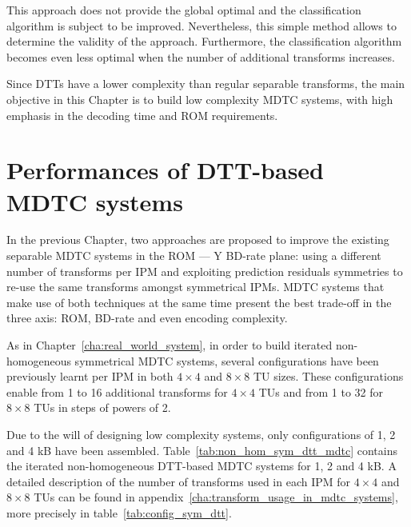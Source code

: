 \documentclass[11pt,a4paper,openright,twoside]{book}
\numberwithin{equation}{section} %
\numberwithin{figure}{section} %
\numberwithin{table}{section} %
\begin{document}
This approach does not provide the global optimal and the classification
algorithm is subject to be improved.
Nevertheless, this simple method allows to determine the validity of the
approach.
Furthermore, the classification algorithm becomes even less optimal when the
number of additional transforms increases.

Since \acp{DTT} have a lower complexity than regular separable transforms, the
main objective in this Chapter is to build low complexity \ac{MDTC} systems,
with high emphasis in the decoding time and \acs{ROM} requirements.

\section{Performances of \acs{DTT}-based \acs{MDTC} systems}
\label{sec:performances_dtt_based_mdtc_systems}

In the previous Chapter, two approaches are proposed to improve the existing
separable \ac{MDTC} systems in the \acs{ROM} --- Y \ac{BD}-rate plane:
using a different number of transforms per \ac{IPM} and exploiting prediction
residuals symmetries to re-use the same transforms amongst symmetrical
\acp{IPM}.
\ac{MDTC} systems that make use of both techniques at the same time present
the best trade-off in the three axis: \acs{ROM}, \ac{BD}-rate and even
encoding complexity.

As in Chapter~\ref{cha:real_world_system}, in order to build iterated
non-homogeneous symmetrical \ac{MDTC} systems, several configurations have
been previously learnt per \ac{IPM} in both $4\times4$ and $8\times8$ \ac{TU}
sizes.
These configurations enable from 1 to 16 additional transforms for $4\times4$
\acp{TU} and from 1 to 32 for $8\times8$ \acp{TU} in steps of powers of 2.

Due to the will of designing low complexity systems, only configurations of 1,
2 and 4 kB have been assembled.
Table~\ref{tab:non_hom_sym_dtt_mdtc} contains the iterated non-homogeneous
DTT-based \acs{MDTC} systems for 1, 2 and 4 kB.
A detailed description of the number of transforms used in each \ac{IPM} for
$4\times4$ and $8\times8$ \acp{TU} can be found in
appendix~\ref{cha:transform_usage_in_mdtc_systems}, more precisely in
table~\ref{tab:config_sym_dtt}.
\end{document}
